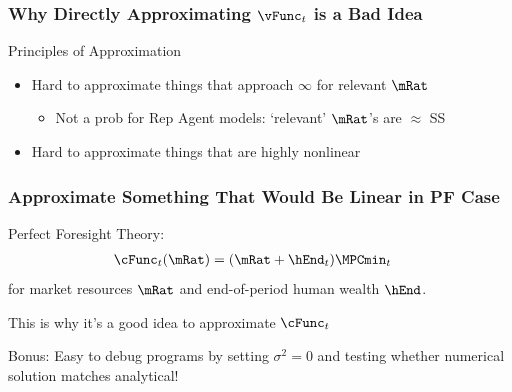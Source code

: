 \documentclass{beamer}
\begin{document}
\begin{frame}
\frametitle{Why Directly Approximating $\vFunc_{t}$ is a Bad Idea}

Principles of Approximation

\begin{itemize}
\item Hard to approximate things that approach $\infty$ for relevant $\mRat$
\begin{itemize}
\item Not a prob for Rep Agent models: `relevant' $\mRat$'s are $\approx$ SS
\end{itemize}
\item Hard to approximate things that are highly nonlinear 
\end{itemize}


\end{frame}


\begin{frame}
\frametitle{Approximate Something That Would Be Linear in PF Case}

\medskip

Perfect Foresight Theory:
\begin{equation}\begin{gathered}\begin{aligned}
  \cFunc_{t}(\mRat)  & = (\mRat+\hEnd_{t})\MPCmin_{t} 
\end{aligned}\end{gathered}\end{equation}
for market resources $\mRat$ and end-of-period human wealth $\hEnd$.


\medskip\medskip
\pause 

This is why it's a good idea to approximate $\cFunc_{t}$ 

\pause \medskip\medskip

Bonus: Easy to debug programs by setting $\sigma^{2} = 0$ and
testing whether numerical solution matches analytical!

\end{frame}
\end{document}
